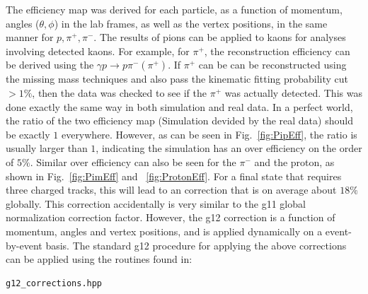 \begin{v2}
The efficiency map was derived for each particle, as a function of momentum, angles ($\theta, \phi$) in the lab frames, as well as the vertex positions, in the same manner for $p, \pi^+, \pi^-$. The results of pions can be applied to kaons for analyses involving detected kaons. For example, for $\pi^+$, the reconstruction efficiency can be derived using the $ \gamma p \rightarrow p \pi^- (\pi^+)$. If $\pi^+$ can be can be reconstructed using the missing mass techniques and also pass the kinematic fitting probability cut $>1 \%$, then the data was checked to see if the $\pi^+$ was actually detected. This was done exactly the same way in both simulation and real data. In a perfect world, the ratio of the two efficiency map (Simulation devided by the real data) should be exactly $1$ everywhere. However, as can be seen in  Fig.~\ref{fig:PipEff}, the ratio is usually larger than $1$, indicating the simulation has an over efficiency on the order of $5 \%$. Similar over efficiency can also be seen for the $\pi^-$ and the proton, as shown in Fig.~\ref{fig:PimEff} and ~\ref{fig:ProtonEff}. For a final state that requires three charged tracks, this will lead to an correction that is on average about $18 \%$ globally. This correction accidentally is very similar to the g11 global normalization correction factor. However, the g12 correction is a function of momentum, angles and vertex positions, and is applied dynamically on a event-by-event basis. The standard g12 procedure for applying the above corrections can be applied using the routines found in:
\begin{verbatim}
g12_corrections.hpp
\end{verbatim}


\end{v2}
